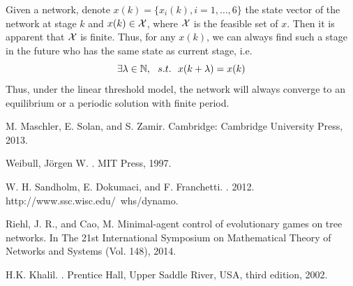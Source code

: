 \documentclass[a4 paper, 12pt]{article}
\begin{document}
Given a network, denote $x(k) = \{x_i(k),i=1,\dots,6\}$ the state vector of the network at stage $k$ and $x(k)\in\mathcal{X}$, where $\mathcal{X}$ is the feasible set of $x$. Then it is apparent that $\mathcal{X}$ is finite. Thus, for any $x(k)$, we can always find such a stage in the future who has the same state as current stage, i.e.
\begin{equation*}
        \exists\lambda\in\mathbb{N}, ~~s.t. ~~x(k+\lambda) = x(k)
\end{equation*}
Thus, under the linear threshold model, the network will always converge to an equilibrium or a periodic solution with finite period.





\begin{thebibliography}{99}

         M. Maschler, E. Solan, and S. Zamir.  Cambridge: Cambridge University Press, 2013.

         Weibull, Jörgen W. . MIT Press, 1997.

         W. H. Sandholm, E. Dokumaci, and F. Franchetti. . 2012. http://www.ssc.wisc.edu/~whs/dynamo.

         Riehl, J. R., and Cao, M. Minimal-agent control of evolutionary games on tree networks. In The 21st International Symposium on Mathematical Theory of Networks and Systems (Vol. 148), 2014.

         H.K. Khalil. . Prentice Hall, Upper Saddle River, USA, third edition, 2002.

\end{thebibliography}
\end{document}
